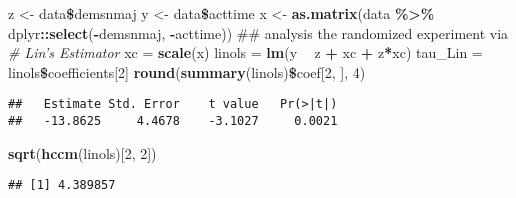 \documentclass[]{article}
\newenvironment{Shaded}{\begin{snugshade}}{\end{snugshade}}
\newcommand{\KeywordTok}[1]{\textcolor[rgb]{0.13,0.29,0.53}{\textbf{#1}}}
\newcommand{\DecValTok}[1]{\textcolor[rgb]{0.00,0.00,0.81}{#1}}
\newcommand{\StringTok}[1]{\textcolor[rgb]{0.31,0.60,0.02}{#1}}
\newcommand{\CommentTok}[1]{\textcolor[rgb]{0.56,0.35,0.01}{\textit{#1}}}
\newcommand{\OperatorTok}[1]{\textcolor[rgb]{0.81,0.36,0.00}{\textbf{#1}}}
\newcommand{\NormalTok}[1]{#1}
\begin{document}
\begin{Shaded}
\begin{Highlighting}[]
\NormalTok{z <-}\StringTok{ }\NormalTok{data}\OperatorTok{\$}\NormalTok{demsnmaj}
\NormalTok{y <-}\StringTok{ }\NormalTok{data}\OperatorTok{\$}\NormalTok{acttime}
\NormalTok{x <-}\StringTok{ }\KeywordTok{as.matrix}\NormalTok{(data }\OperatorTok{\%>\%}
\StringTok{  }\NormalTok{dplyr}\OperatorTok{::}\KeywordTok{select}\NormalTok{(}\OperatorTok{-}\NormalTok{demsnmaj, }\OperatorTok{-}\NormalTok{acttime))}
\NormalTok{## analysis the randomized experiment via}
\CommentTok{# Lin's Estimator}
\NormalTok{xc =}\StringTok{ }\KeywordTok{scale}\NormalTok{(x)}
\NormalTok{linols =}\StringTok{ }\KeywordTok{lm}\NormalTok{(y }\OperatorTok{~}\StringTok{ }\NormalTok{z }\OperatorTok{+}\StringTok{ }\NormalTok{xc }\OperatorTok{+}\StringTok{ }\NormalTok{z}\OperatorTok{*}\NormalTok{xc)}
\NormalTok{tau_Lin =}\StringTok{ }\NormalTok{linols}\OperatorTok{\$}\NormalTok{coefficients[}\DecValTok{2}\NormalTok{]}
\KeywordTok{round}\NormalTok{(}\KeywordTok{summary}\NormalTok{(linols)}\OperatorTok{\$}\NormalTok{coef[}\DecValTok{2}\NormalTok{, ], }\DecValTok{4}\NormalTok{)}
\end{Highlighting}
\end{Shaded}

\begin{verbatim}
##   Estimate Std. Error    t value   Pr(>|t|) 
##   -13.8625     4.4678    -3.1027     0.0021
\end{verbatim}

\begin{Shaded}
\begin{Highlighting}[]
\KeywordTok{sqrt}\NormalTok{(}\KeywordTok{hccm}\NormalTok{(linols)[}\DecValTok{2}\NormalTok{, }\DecValTok{2}\NormalTok{])}
\end{Highlighting}
\end{Shaded}

\begin{verbatim}
## [1] 4.389857
\end{verbatim}
\end{document}
